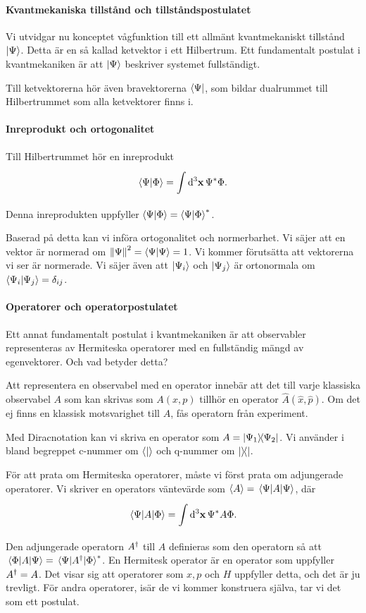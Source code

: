 \paragraph{Kvantmekaniska tillstånd och tillståndspostulatet}
Vi utvidgar nu konceptet vågfunktion till ett allmänt kvantmekaniskt tillstånd $\ket{\Psi}$. Detta är en så kallad ketvektor i ett Hilbertrum. Ett fundamentalt postulat i kvantmekaniken är att $\ket{\Psi}$ beskriver systemet fullständigt.

Till ketvektorerna hör även bravektorerna $\bra{\Psi}$, som bildar dualrummet till Hilbertrummet som alla ketvektorer finns i.

\paragraph{Inreprodukt och ortogonalitet}
Till Hilbertrummet hör en inreprodukt
\begin{align*}
	\braket{\Psi}{\Phi} = \int\limits_{}^{}\dd[3]{\vb{x}}\Psi^{*}\Phi.
\end{align*}
Denna inreprodukten uppfyller $\braket{\Psi}{\Phi} = \braket{\Psi}{\Phi}^{*}$.

Baserad på detta kan vi införa ortogonalitet och normerbarhet. Vi säjer att en vektor är normerad om $\norm{\Psi}^{2} = \braket{\Psi} = 1$. Vi kommer förutsätta att vektorerna vi ser är normerade. Vi säjer även att $\ket{\Psi_{i}}$ och $\ket{\Psi_{j}}$ är ortonormala om $\braket{\Psi_{i}}{\Psi_{j}} = \delta_{ij}$.

\paragraph{Operatorer och operatorpostulatet}
Ett annat fundamentalt postulat i kvantmekaniken är att observabler representeras av Hermiteska operatorer med en fullständig mängd av egenvektorer. Och vad betyder detta?

Att representera en observabel med en operator innebär att det till varje klassiska observabel $A$ som kan skrivas som $A(x, p)$ tillhör en operator $\hat{A}(\hat{x}, \hat{p})$. Om det ej finns en klassisk motsvarighet till $A$, fås operatorn från experiment.

Med Diracnotation kan vi skriva en operator som $A = \op{\Psi_{1}}{\Psi_{2}}$. Vi använder i bland begreppet c-nummer om $\braket{}$ och q-nummer om $\op{}{}$.

För att prata om Hermiteska operatorer, måste vi först prata om adjungerade operatorer. Vi skriver en operators väntevärde som $\expval{A} = \expval{A}{\Psi}$, där
\begin{align*}
	\mel{\Psi}{A}{\Phi} = \int\limits_{}^{}\dd[3]{\vb{x}}\Psi^{*}A\Phi.
\end{align*}
Den adjungerade operatorn $A^{\dagger}$ till $A$ definieras som den operatorn så att $\mel{\Phi}{A}{\Psi} = \mel{\Psi}{A^{\dagger}}{\Phi}^{*}$. En Hermitesk operator är en operator som uppfyller $A^{\dagger} = A$. Det visar sig att operatorer som $x, p$ och $H$ uppfyller detta, och det är ju trevligt. För andra operatorer, isär de vi kommer konstruera själva, tar vi det som ett postulat.

